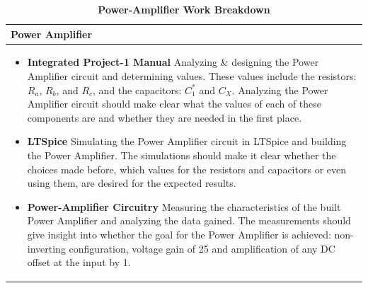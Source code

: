 \begin{table}[h!]
\captionsetup{justification=centering, labelfont=bf}
\caption{\textbf{Power-Amplifier Work Breakdown}}
\begin{tabular*}{\textwidth}{@{\extracolsep{\fill}} p{} @{}} 
\toprule
     \textbf{Power Amplifier} \\
     \midrule
    \begin{itemize}
        \item \textbf{Integrated Project-1 Manual} \newline Analyzing \& designing the Power Amplifier circuit and determining values. These values include the resistors: $\textit{R}_a$, $\textit{R}_b$, and $\textit{R}_c$, and the capacitors: $C^{*}_1$ and $C_X$. Analyzing the Power Amplifier circuit should make clear what the values of each of these components are and whether they are needed in the first place.
        \item \textbf{LTSpice} \newline Simulating the Power Amplifier circuit in LTSpice and building the Power Amplifier. The simulations should make it clear whether the choices made before, which values for the resistors and capacitors or even using them, are desired for the expected results.
        \item \textbf{Power-Amplifier Circuitry} \newline Measuring the characteristics of the built Power Amplifier and analyzing the data gained. The measurements should give insight into whether the goal for the Power Amplifier is achieved: non-inverting configuration, voltage gain of 25 and amplification of any DC offset at the input by 1. 
    \end{itemize} \\
     \bottomrule
\end{tabular*}

\label{tab:PA Work Breakdown}
\end{table}

\newpage

